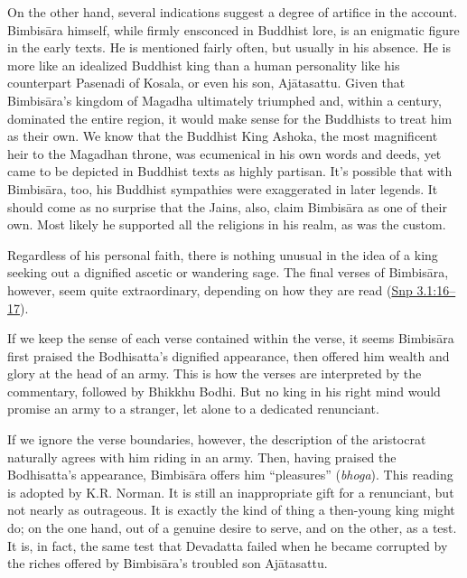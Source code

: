 \documentclass[12pt,openany]{book}%
\begin{document}
On the other hand, several indications suggest a degree of artifice in the account. \textsanskrit{Bimbisāra} himself, while firmly ensconced in Buddhist lore, is an enigmatic figure in the early texts. He is mentioned fairly often, but usually in his absence. He is more like an idealized Buddhist king than a human personality like his counterpart Pasenadi of Kosala, or even his son, \textsanskrit{Ajātasattu}. Given that \textsanskrit{Bimbisāra}’s kingdom of Magadha ultimately triumphed and, within a century, dominated the entire region, it would make sense for the Buddhists to treat him as their own. We know that the Buddhist King Ashoka, the most magnificent heir to the Magadhan throne, was ecumenical in his own words and deeds, yet came to be depicted in Buddhist texts as highly partisan. It’s possible that with \textsanskrit{Bimbisāra}, too, his Buddhist sympathies were exaggerated in later legends. It should come as no surprise that the Jains, also, claim \textsanskrit{Bimbisāra} as one of their own. Most likely he supported all the religions in his realm, as was the custom.

Regardless of his personal faith, there is nothing unusual in the idea of a king seeking out a dignified ascetic or wandering sage. The final verses of \textsanskrit{Bimbisāra}, however, seem quite extraordinary, depending on how they are read (\href{https://suttacentral.net/snp3.1/en/sujato\#16}{Snp 3.1:16–17}).

If we keep the sense of each verse contained within the verse, it seems \textsanskrit{Bimbisāra} first praised the Bodhisatta’s dignified appearance, then offered him wealth and glory at the head of an army. This is how the verses are interpreted by the commentary, followed by Bhikkhu Bodhi. But no king in his right mind would promise an army to a stranger, let alone to a dedicated renunciant.

If we ignore the verse boundaries, however, the description of the aristocrat naturally agrees with him riding in an army. Then, having praised the Bodhisatta’s appearance, \textsanskrit{Bimbisāra} offers him “pleasures” (\textit{bhoga}). This reading is adopted by K.R. Norman. It is still an inappropriate gift for a renunciant, but not nearly as outrageous. It is exactly the kind of thing a then-young king might do; on the one hand, out of a genuine desire to serve, and on the other, as a test. It is, in fact, the same test that Devadatta failed when he became corrupted by the riches offered by \textsanskrit{Bimbisāra}’s troubled son \textsanskrit{Ajātasattu}.
\end{document}
